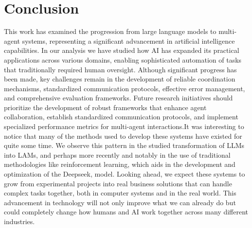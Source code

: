\documentclass[journal,twoside,10pt]{IEEEtran}
\begin{document}
\section{Conclusion}

This work has examined the progression from large language models to multi-agent systems, representing a significant advancement in artificial intelligence capabilities. In our analysis we have studied how AI has expanded its practical applications across various domains, enabling sophisticated automation of tasks that traditionally required human oversight. Although significant progress has been made, key challenges remain in the development of reliable coordination mechanisms, standardized communication protocols, effective error management, and comprehensive evaluation frameworks. 
Future research initiatives should prioritize the development of robust frameworks that enhance agent collaboration, establish standardized communication protocols, and implement specialized performance metrics for multi-agent interactions.It was interesting to notice that many of the methods used to develop these systems have existed for quite some time. We observe this pattern in the studied transformation of LLMs into LAMs, and perhaps more recently and notably in the use of traditional methodologies like reinforcement learning, which aids in the development and optimization of the Deepseek, \cite{liu2024deepseekv3} model.
Looking ahead, we expect these systems to grow from experimental projects into real business solutions that can handle complex tasks together, both in computer systems and in the real world. This advancement in technology will not only improve what we can already do but could completely change how humans and AI work together across many different industries.




 
\end{document}
